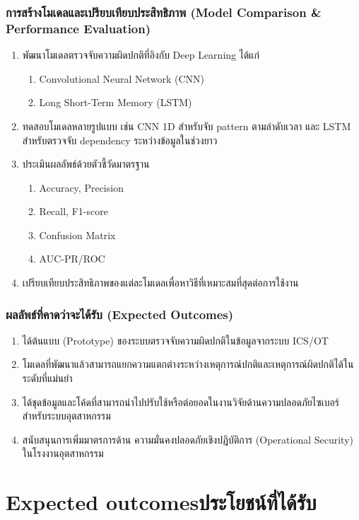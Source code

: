 \subsubsection{การสร้างโมเดลและเปรียบเทียบประสิทธิภาพ (Model Comparison \& Performance Evaluation)}
\begin{enumerate}
    \item พัฒนาโมเดลตรวจจับความผิดปกติที่อิงกับ Deep Learning ได้แก่ 
    \begin{enumerate}
        \item Convolutional Neural Network (CNN)
        \item  Long Short-Term Memory (LSTM)
    \end{enumerate}
    \item ทดสอบโมเดลหลายรูปแบบ เช่น CNN 1D สำหรับจับ pattern ตามลำดับเวลา และ LSTM สำหรับตรวจจับ dependency ระหว่างข้อมูลในช่วงยาว
    \item ประเมินผลลัพธ์ด้วยตัวชี้วัดมาตรฐาน
    \begin{enumerate}
        \item Accuracy, Precision
        \item Recall, F1-score
        \item Confusion Matrix 
        \item AUC-PR/ROC
    \end{enumerate}
    \item เปรียบเทียบประสิทธิภาพของแต่ละโมเดลเพื่อหาวิธีที่เหมาะสมที่สุดต่อการใช้งาน
\end{enumerate}

\subsubsection{ผลลัพธ์ที่คาดว่าจะได้รับ (Expected Outcomes)}
\begin{enumerate}
    \item ได้ต้นแบบ (Prototype) ของระบบตรวจจับความผิดปกติในข้อมูลจากระบบ ICS/OT
    \item โมเดลที่พัฒนาแล้วสามารถแยกความแตกต่างระหว่างเหตุการณ์ปกติและเหตุการณ์ผิดปกติได้ในระดับที่แม่นยำ
    \item ได้ชุดข้อมูลและโค้ดที่สามารถนำไปปรับใช้หรือต่อยอดในงานวิจัยด้านความปลอดภัยไซเบอร์ \\ สำหรับระบบอุตสาหกรรม
    \item สนับสนุนการเพิ่มมาตรการด้าน ความมั่นคงปลอดภัยเชิงปฏิบัติการ (Operational Security) ในโรงงานอุตสาหกรรม
\end{enumerate}

\section{\ifenglish Expected outcomes\else ประโยชน์ที่ได้รับ\fi}

